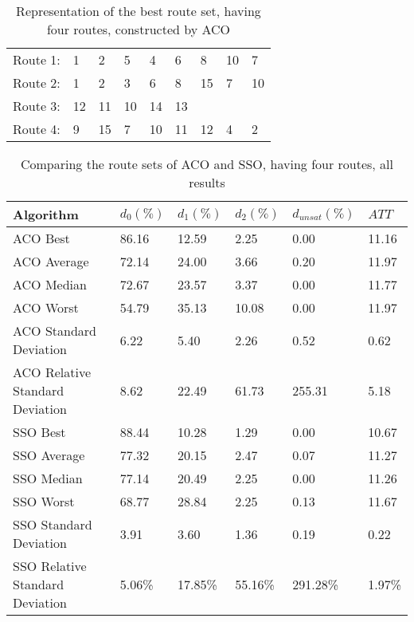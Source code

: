 \begin{table}[H]
    \centering
    \begin{tabular}{|l|llllllll|}
    \hline
    Route 1: & 1 & 2 & 5 & 4 & 6 & 8 & 10 & 7 \\
    Route 2: & 1 & 2 & 3 & 6 & 8 & 15 & 7 & 10 \\
    Route 3: & 12 & 11 & 10 & 14 & 13 &  &  & \\
    Route 4: & 9 & 15 & 7 & 10 & 11 & 12 & 4 & 2 \\
    \hline
    \end{tabular}
    \caption {Representation of the best route set, having four routes, constructed by ACO}
    \label{table:performanceComparison_bestRouteSet4_ACO}
\end{table}

    \begin{table}[H]
    \centering
    \begin{tabular}{|l||l|l|l|l|l|}
    \hline
    Algorithm & $d_0(\%)$ & $d_1(\%)$ & $d_2(\%)$ & $d_{unsat}(\%)$ & $ATT$ \\
    \hline
    ACO Best & 86.16 & 12.59 & 2.25 & 0.00 & 11.16 \\
    ACO Average & 72.14 & 24.00 & 3.66 & 0.20 & 11.97 \\
    ACO Median & 72.67 & 23.57 & 3.37 & 0.00 & 11.77 \\
    ACO Worst & 54.79 & 35.13 & 10.08 & 0.00 & 11.97 \\
    ACO Standard Deviation & 6.22 & 5.40 & 2.26 & 0.52 & 0.62 \\
    ACO Relative Standard Deviation & 8.62 & 22.49 & 61.73 & 255.31 & 5.18 \\
    \hline
    \hline
    SSO Best & 88.44 & 10.28 & 1.29 & 0.00 & 10.67 \\
    SSO Average & 77.32 & 20.15 & 2.47 & 0.07 & 11.27 \\
    SSO Median & 77.14 & 20.49 & 2.25 & 0.00 & 11.26 \\
    SSO Worst & 68.77 & 28.84 & 2.25 & 0.13 & 11.67 \\
    SSO Standard Deviation & 3.91 & 3.60 & 1.36 & 0.19 & 0.22 \\
    SSO Relative Standard Deviation & 5.06\% & 17.85\% & 55.16\% & 291.28\% & 1.97\% \\
    \hline
    \end{tabular}
    \caption {Comparing the route sets of ACO and SSO, having four routes, all results}
    \label{table:performanceComparison_ACOFull}
    \end{table}

